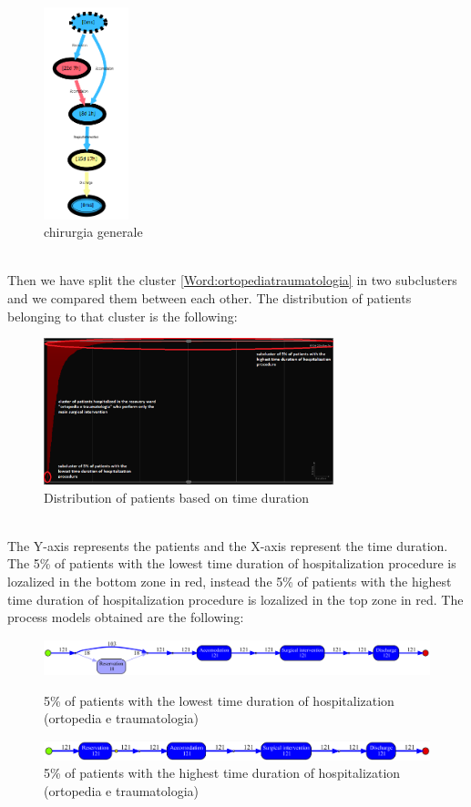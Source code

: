 \begin{figure} [htbp]
\includegraphics[width=0.22\textwidth]{RicoveriTransitionSystemSojourn0901}
\caption{chirurgia generale}
\end{figure}\\
Then we have split the cluster \ref{Word:ortopediatraumatologia} in two subclusters and we compared them between each other. The distribution of patients belonging to that cluster is the following:
\begin{figure} [htbp]
\includegraphics[width=0.75\textwidth]{RicoveriChart3}
\caption{Distribution of patients based on time duration}
\end{figure}\\
The Y-axis represents the patients and the X-axis represent the time duration. The 5\% of patients with the lowest time duration of hospitalization procedure is lozalized in the bottom zone in red, instead the 5\% of patients with the highest time duration of hospitalization procedure is lozalized in the top zone in red. 
\clearpage
\noindent
The process models obtained are the following:
\begin{figure} [htbp]
\includegraphics[width=\textwidth]{RicoveriInductiveVisualMiner3601Fast}
\caption{5\% of patients with the lowest time duration of hospitalization (ortopedia e traumatologia)}
\includegraphics[width=\textwidth]{RicoveriInductiveVisualMiner3601Slow}
\caption{5\% of patients with the highest time duration of hospitalization (ortopedia e traumatologia)}
\end{figure}\\
